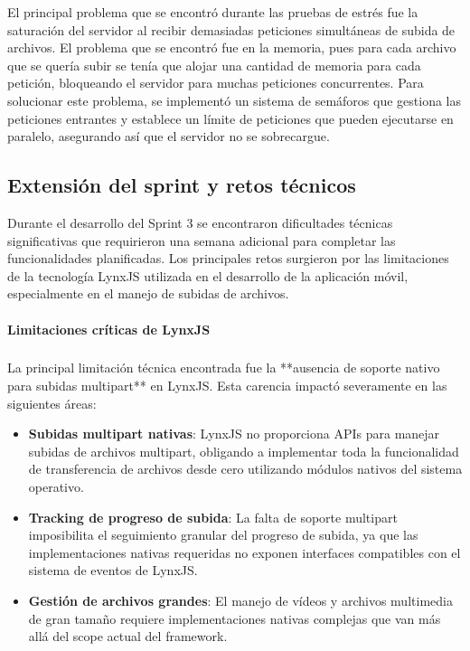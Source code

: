 El principal problema que se encontró durante las pruebas de estrés fue la saturación del servidor al recibir demasiadas peticiones simultáneas de subida de archivos. El problema que se encontró fue en la memoria, pues para cada archivo que se quería subir se tenía que alojar una cantidad de memoria para cada petición, bloqueando el servidor para muchas peticiones concurrentes. Para solucionar este problema, se implementó un sistema de semáforos que gestiona las peticiones entrantes y establece un límite de peticiones que pueden ejecutarse en paralelo, asegurando así que el servidor no se sobrecargue.

\subsection{Extensión del sprint y retos técnicos}

Durante el desarrollo del Sprint 3 se encontraron dificultades técnicas significativas que requirieron una semana adicional para completar las funcionalidades planificadas. Los principales retos surgieron por las limitaciones de la tecnología LynxJS utilizada en el desarrollo de la aplicación móvil, especialmente en el manejo de subidas de archivos.

\paragraph{Limitaciones críticas de LynxJS}
\subparagraph{}

La principal limitación técnica encontrada fue la **ausencia de soporte nativo para subidas multipart** en LynxJS. Esta carencia impactó severamente en las siguientes áreas:

\begin{itemize}
    \item \textbf{Subidas multipart nativas}: LynxJS no proporciona APIs para manejar subidas de archivos multipart, obligando a implementar toda la funcionalidad de transferencia de archivos desde cero utilizando módulos nativos del sistema operativo.
    
    \item \textbf{Tracking de progreso de subida}: La falta de soporte multipart imposibilita el seguimiento granular del progreso de subida, ya que las implementaciones nativas requeridas no exponen interfaces compatibles con el sistema de eventos de LynxJS.
    
    \item \textbf{Gestión de archivos grandes}: El manejo de vídeos y archivos multimedia de gran tamaño requiere implementaciones nativas complejas que van más allá del scope actual del framework.
\end{itemize}

